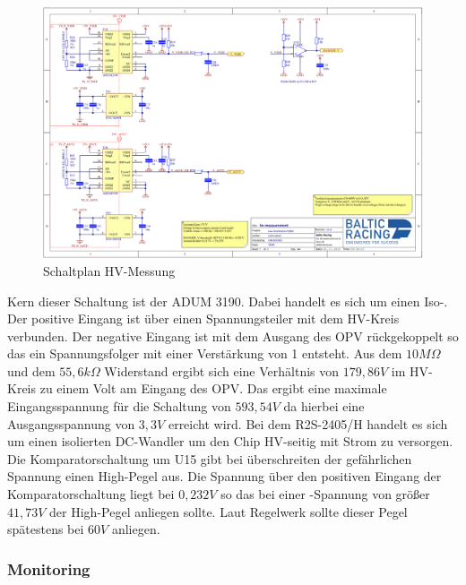 \begin{figure}
	\centering
	\includegraphics[width=0.7\linewidth]{bilder/HV_Measurement_PNG}
	\caption{Schaltplan \ac{HV}-Messung}
	\label{fig:hvmeasurementpng}
\end{figure}

Kern dieser Schaltung ist der ADUM 3190. Dabei handelt es sich um einen Iso-. Der positive Eingang ist über einen Spannungsteiler mit dem \ac{HV}-Kreis verbunden. Der negative Eingang ist mit dem Ausgang des \ac{OPV} rückgekoppelt so das ein Spannungsfolger mit einer Verstärkung von 1 entsteht. Aus dem \ensuremath{10 M\Omega} und dem \ensuremath{55,6 k\Omega} Widerstand ergibt sich eine Verhältnis von \ensuremath{179,86 V} im \ac{HV}-Kreis zu einem Volt am Eingang des \ac{OPV}. Das ergibt eine maximale Eingangsspannung für die Schaltung von \ensuremath{593,54 V} da hierbei eine Ausgangsspannung von \ensuremath{3,3 V} erreicht wird. Bei dem R2S-2405/H handelt es sich um einen isolierten DC-Wandler um den Chip \ac{HV}-seitig mit Strom zu versorgen. Die Komparatorschaltung um U15 gibt bei überschreiten der gefährlichen Spannung einen High-Pegel aus. Die Spannung über den positiven Eingang der Komparatorschaltung liegt bei \ensuremath{0,232 V} so das bei einer -Spannung von größer \ensuremath{41,73 V} der High-Pegel anliegen sollte. Laut Regelwerk sollte dieser Pegel spätestens bei \ensuremath{60V} anliegen.

\FloatBarrier
\subsubsection{ Monitoring}

